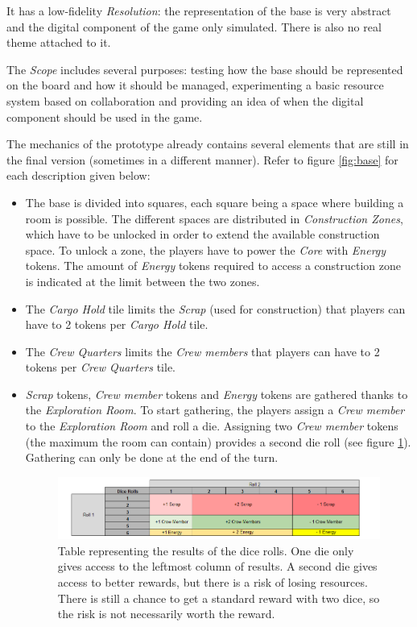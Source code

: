 It has a low-fidelity \textit{Resolution}: the representation of the base is very abstract and the digital component of the game only simulated. There is also no real theme attached to it. 

The \textit{Scope} includes several purposes: testing how the base should be represented on the board and how it should be managed, experimenting a basic resource system based on collaboration and providing an idea of when the digital component should be used in the game.

The mechanics of the prototype already contains several elements that are still in the final version (sometimes in a different manner). Refer to figure \ref{fig:base} for each description given below:
\begin{itemize}
\item The base is divided into squares, each square being a space where building a room is possible. The different spaces are distributed in \textit{Construction Zones}, which have to be unlocked in order to extend the available construction space. To unlock a zone, the players have to power the \textit{Core} with \textit{Energy} tokens. The amount of \textit{Energy} tokens required to access a construction zone is indicated at the limit between the two zones.
\item The \textit{Cargo Hold} tile limits the \textit{Scrap} (used for construction) that players can have to 2 tokens per \textit{Cargo Hold} tile.
\item The \textit{Crew Quarters} limits the \textit{Crew members} that players can have to 2 tokens per \textit{Crew Quarters} tile.
\item \textit{Scrap} tokens, \textit{Crew member} tokens and \textit{Energy} tokens are gathered thanks to the \textit{Exploration Room}. To start gathering, the players assign a \textit{Crew member} to the \textit{Exploration Room} and roll a die. Assigning two \textit{Crew member} tokens (the maximum the room can contain) provides a second die roll (see figure \ref{fig:Dicetable}). Gathering can only be done at the end of the turn.
\begin{figure}[!ht]
    \centering
    \includegraphics[scale=0.6]{Images/DiceProto1.png}
    \caption{Table representing the results of the dice rolls. One die only gives access to the leftmost column of results. A second die gives access to better rewards, but there is a risk of losing resources. There is still a chance to get a standard reward with two dice, so the risk is not necessarily worth the reward.}
    \label{fig:Dicetable}
\end{figure}
\end{itemize}

